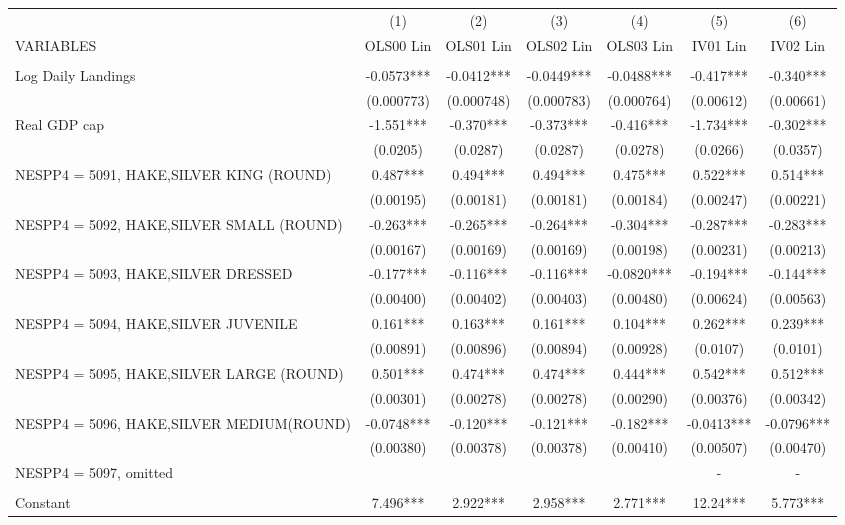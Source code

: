 \begin{tabular}{lcccccc} \hline
 & (1) & (2) & (3) & (4) & (5) & (6) \\
VARIABLES & OLS00 Lin & OLS01 Lin & OLS02 Lin & OLS03 Lin & IV01 Lin & IV02 Lin \\ \hline
 &  &  &  &  &  &  \\
Log Daily Landings & -0.0573*** & -0.0412*** & -0.0449*** & -0.0488*** & -0.417*** & -0.340*** \\
 & (0.000773) & (0.000748) & (0.000783) & (0.000764) & (0.00612) & (0.00661) \\
Real GDP cap & -1.551*** & -0.370*** & -0.373*** & -0.416*** & -1.734*** & -0.302*** \\
 & (0.0205) & (0.0287) & (0.0287) & (0.0278) & (0.0266) & (0.0357) \\
NESPP4 = 5091, HAKE,SILVER KING (ROUND) & 0.487*** & 0.494*** & 0.494*** & 0.475*** & 0.522*** & 0.514*** \\
 & (0.00195) & (0.00181) & (0.00181) & (0.00184) & (0.00247) & (0.00221) \\
NESPP4 = 5092, HAKE,SILVER SMALL (ROUND) & -0.263*** & -0.265*** & -0.264*** & -0.304*** & -0.287*** & -0.283*** \\
 & (0.00167) & (0.00169) & (0.00169) & (0.00198) & (0.00231) & (0.00213) \\
NESPP4 = 5093, HAKE,SILVER DRESSED & -0.177*** & -0.116*** & -0.116*** & -0.0820*** & -0.194*** & -0.144*** \\
 & (0.00400) & (0.00402) & (0.00403) & (0.00480) & (0.00624) & (0.00563) \\
NESPP4 = 5094, HAKE,SILVER JUVENILE & 0.161*** & 0.163*** & 0.161*** & 0.104*** & 0.262*** & 0.239*** \\
 & (0.00891) & (0.00896) & (0.00894) & (0.00928) & (0.0107) & (0.0101) \\
NESPP4 = 5095, HAKE,SILVER LARGE (ROUND) & 0.501*** & 0.474*** & 0.474*** & 0.444*** & 0.542*** & 0.512*** \\
 & (0.00301) & (0.00278) & (0.00278) & (0.00290) & (0.00376) & (0.00342) \\
NESPP4 = 5096, HAKE,SILVER MEDIUM(ROUND) & -0.0748*** & -0.120*** & -0.121*** & -0.182*** & -0.0413*** & -0.0796*** \\
 & (0.00380) & (0.00378) & (0.00378) & (0.00410) & (0.00507) & (0.00470) \\
NESPP4 = 5097, omitted &  &  &  &  & - & - \\
 &  &  &  &  &  &  \\
Constant & 7.496*** & 2.922*** & 2.958*** & 2.771*** & 12.24*** & 5.773*** \\

\end{tabular}
